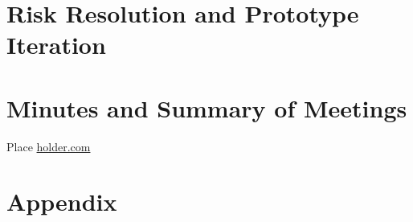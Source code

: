 \documentclass{article}
\begin{document}
    \newpage

    \section{Risk Resolution and Prototype Iteration}
    \newpage

    \section{Minutes and Summary of Meetings}
    \newpage

    \begin{thebibliography}{9}
        \raggedright
            Place \url{holder.com}
    \end{thebibliography}

    \newpage
    \section{Appendix}
    \label{sec:Appendix}
    
    
\end{document}
